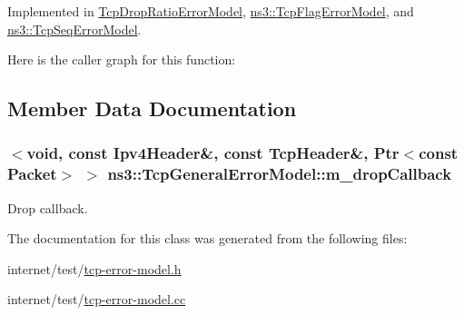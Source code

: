 Implemented in \hyperlink{classTcpDropRatioErrorModel_a7e543a7b2bb5a40320dac331e80976f7}{Tcp\+Drop\+Ratio\+Error\+Model}, \hyperlink{classns3_1_1TcpFlagErrorModel_a078b078644aa6ea2527956fb99a84916}{ns3\+::\+Tcp\+Flag\+Error\+Model}, and \hyperlink{classns3_1_1TcpSeqErrorModel_a3958ef76d5830e46a4f5f890eb1397a3}{ns3\+::\+Tcp\+Seq\+Error\+Model}.



Here is the caller graph for this function\+:




\subsection{Member Data Documentation}
\subsubsection[{\texorpdfstring{m\+\_\+drop\+Callback}{m_dropCallback}}]{$<$void, const {\bf Ipv4\+Header}\&, const {\bf Tcp\+Header}\&, {\bf Ptr}$<$const {\bf Packet}$>$ $>$ ns3\+::\+Tcp\+General\+Error\+Model\+::m\+\_\+drop\+Callback\hspace{0.3cm}{\ttfamily [private]}}\hypertarget{classns3_1_1TcpGeneralErrorModel_a8c608cfd9642b92571b8b4cc771bd55f}{}\label{classns3_1_1TcpGeneralErrorModel_a8c608cfd9642b92571b8b4cc771bd55f}


Drop callback. 



The documentation for this class was generated from the following files\+:\begin{DoxyCompactItemize}
\item 
internet/test/\hyperlink{tcp-error-model_8h}{tcp-\/error-\/model.\+h}\item 
internet/test/\hyperlink{tcp-error-model_8cc}{tcp-\/error-\/model.\+cc}\end{DoxyCompactItemize}
